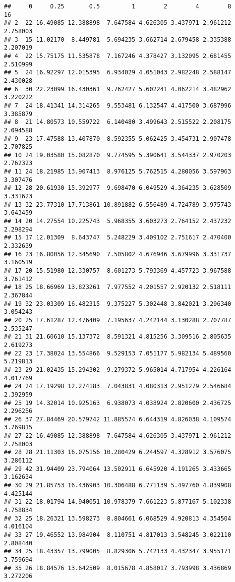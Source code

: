 \documentclass[]{article}
\begin{document}
\begin{verbatim}
##     0     0.25       0.5         1        2        4        8       16
## 2  22 16.49085 12.388898  7.647584 4.626305 3.437971 2.961212 2.758003
## 3  15 11.02170  8.449781  5.694235 3.662714 2.679458 2.335388 2.207019
## 4  22 15.75175 11.535878  7.167246 4.378427 3.132095 2.681455 2.510999
## 5  24 16.92297 12.015395  6.934029 4.051043 2.982248 2.588147 2.430028
## 6  30 22.23099 16.430361  9.762427 5.602241 4.062214 3.482962 3.220222
## 7  24 18.41341 14.314265  9.553481 6.132547 4.417500 3.687996 3.385879
## 8  21 14.80573 10.559722  6.140480 3.499643 2.515522 2.208175 2.094588
## 9  23 17.47588 13.407870  8.592355 5.062425 3.454731 2.907478 2.707825
## 10 24 19.03580 15.082870  9.774595 5.390641 3.544337 2.970203 2.762323
## 11 24 18.21985 13.907413  8.976125 5.762515 4.280056 3.597963 3.307476
## 12 28 20.61930 15.392977  9.698470 6.049529 4.364235 3.628509 3.331623
## 13 32 23.77310 17.713861 10.891882 6.556489 4.724789 3.975743 3.643459
## 14 20 14.27554 10.225743  5.968355 3.603273 2.764152 2.437232 2.298294
## 15 17 12.01309  8.643747  5.248229 3.409102 2.751617 2.470400 2.332639
## 16 23 16.80056 12.345690  7.505802 4.676946 3.679996 3.331737 3.160519
## 17 20 15.51980 12.330757  8.601273 5.793369 4.457723 3.967588 3.761412
## 18 25 18.66969 13.823261  7.977552 4.201557 2.920132 2.518111 2.367844
## 19 32 23.03309 16.482315  9.375227 5.302448 3.842021 3.296340 3.054243
## 20 25 17.61287 12.476409  7.195637 4.242144 3.130288 2.707787 2.535247
## 21 31 21.60610 15.137372  8.591321 4.815256 3.309516 2.805635 2.619273
## 22 23 17.38024 13.554866  9.529153 7.051177 5.982134 5.489560 5.219813
## 23 29 21.02435 15.294302  9.279372 5.965014 4.717954 4.226164 4.017769
## 24 24 17.19298 12.274183  7.043831 4.080313 2.951279 2.546684 2.392959
## 25 19 14.32014 10.925163  6.938073 4.038924 2.820600 2.436725 2.296256
## 26 37 27.84469 20.579742 11.885574 6.644319 4.826038 4.109574 3.769815
## 27 22 16.49085 12.388898  7.647584 4.626305 3.437971 2.961212 2.758003
## 28 28 21.11303 16.075156 10.280429 6.244597 4.328912 3.576075 3.286112
## 29 42 31.94409 23.794064 13.502911 6.645920 4.191265 3.433665 3.162634
## 30 29 21.85753 16.436903 10.306488 6.771139 5.497760 4.839908 4.425144
## 31 22 18.01794 14.940051 10.978379 7.661223 5.877167 5.102338 4.758834
## 32 25 18.26321 13.598273  8.804661 6.068529 4.920813 4.354504 4.016104
## 33 27 19.46552 13.984904  8.110751 4.817013 3.548245 3.022110 2.808440
## 34 25 18.43357 13.799005  8.829306 5.742133 4.432347 3.955171 3.759694
## 35 26 18.84576 13.642509  8.015678 4.858017 3.793998 3.436869 3.272206

\end{verbatim}
\end{document}
